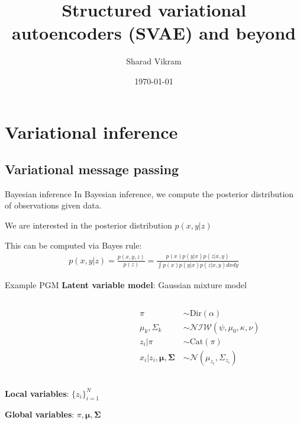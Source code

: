 \documentclass[10pt, compress]{beamer}
\title{Structured variational autoencoders (SVAE) and beyond}
\subtitle{}
\date{\today}
\author{Sharad Vikram}
\institute{UCSD}
\begin{document}
\begin{frame}
  \titlepage
\end{frame}

\section{Variational inference}

\subsection{Variational message passing}

\begin{frame}{Bayesian inference}
  In Bayesian inference, we compute the posterior
  distribution of observations given data.

  \pause

    \begin{center}
      
    \end{center}
  \pause
  We are interested in the posterior distribution $p(x, y | z)$

  \pause
  This can be computed via Bayes rule:
  \begin{align*}
    p(x, y | z) = \frac{p(x, y, z)}{p(z)} = \frac{p(x)p(y | x)p(z | x, y)}{\int p(x)p(y | x)p(z | x, y)dx dy}
  \end{align*}
\end{frame}

\begin{frame}{Example PGM}
  \textbf{Latent variable model}: Gaussian mixture model
  \begin{columns}
    \begin{column}{0.5\textwidth}
      \begin{center}
        
      \end{center}
    \end{column}
    \begin{column}{0.5\textwidth}
      \begin{align*}
        \pi &\sim \textrm{Dir}(\alpha) \\
        \mu_k, \Sigma_k &\sim \mathcal{NIW}(\psi, \mu_0, \kappa, \nu) \\
        z_i | \pi &\sim \textrm{Cat}(\pi) \\
        x_i | z_i, \bm{\mu}, \bm{\Sigma} \ &\sim \mathcal{N}(\mu_{z_i}, \Sigma_{z_i}) \\
      \end{align*}
    \end{column}
  \end{columns}

  \pause
  \textbf{Local variables}: $\{z_i\}_{i=1}^N$

  \pause
  \textbf{Global variables}: $\pi, \bm{\mu}, \bm{\Sigma}$
\end{frame}
\end{document}
